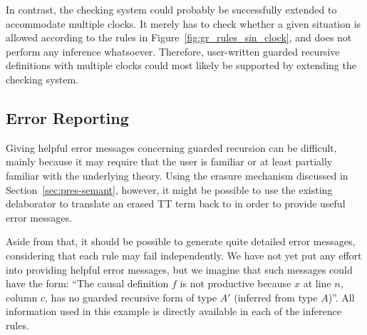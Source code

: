 In contrast, the checking system could probably be successfully extended to
accommodate multiple clocks. It merely has to check whether a given situation is
allowed according to the rules in Figure~\ref{fig:gr_rules_sin_clock}, and does
not perform any inference whatsoever. Therefore, user-written guarded recursive
definitions with multiple clocks could most likely be supported by extending the
checking system.

\subsection{Error Reporting}
\label{sec:error-reporting}
Giving helpful error messages concerning guarded recursion can be difficult,
mainly because it may require that the user is familiar or at least partially
familiar with the underlying theory. Using the erasure mechanism discussed in
Section~\ref{sec:pres-semant}, however, it might be possible to use the existing
delaborator to translate an erased TT term back to \IdrisM{} in order to provide
useful error messages.

Aside from that, it should be possible to
generate quite detailed error messages, considering that each rule may fail
independently. We have not yet put any effort into providing helpful error
messages, but we imagine that such messages could have the form: ``The causal
definition $f$ is not productive because $x$ at line $n$, column $c$, has no
guarded recursive form of type $A'$ (inferred from type $A$)''. All information
used in this example is directly available in each of the inference rules.






